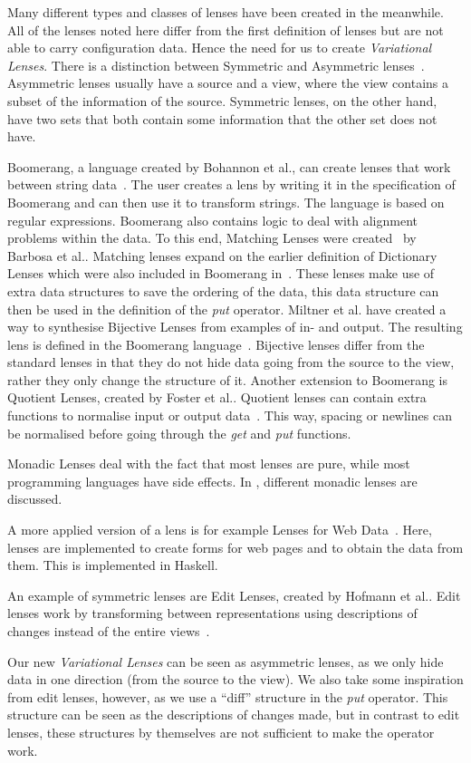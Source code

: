 Many different types and classes of lenses have been created in the meanwhile.
All of the lenses noted here differ from the first definition of lenses but
are not able to carry configuration data. Hence the need for us to create \emph{Variational Lenses}.
There is a distinction between Symmetric and Asymmetric lenses~\cite{hofmann2011symmetric}.
Asymmetric lenses usually have a source and a view, where the view contains a
subset of the information of the source. Symmetric lenses, on the other hand,
have two sets that both contain some information that the other set does not
have. 

Boomerang, a language created by Bohannon et al., can create lenses that work
between string data~\cite{bohannon2008boomerang}. The user creates a lens by
writing it in the specification of Boomerang and can then use it to transform
strings. The language is based on regular expressions. Boomerang also contains
logic to deal with alignment problems within the data. To this end, Matching
Lenses were created~\cite{barbosa2010matching} by Barbosa et al.. Matching
lenses expand on the earlier definition of Dictionary Lenses which were also
included in Boomerang in~\cite{bohannon2008boomerang}. These lenses make use of
extra data structures to save the ordering of the data, this data structure can
then be used in the definition of the \emph{put} operator. Miltner et al. have
created a way to synthesise Bijective Lenses from examples of in- and output.
The resulting lens is defined in the Boomerang language~\cite{miltner2017synthesizing}.
Bijective lenses differ from the standard lenses in that they do not hide data
going from the source to the view, rather they only change the structure of it.
Another extension to Boomerang is Quotient Lenses, created by Foster et al..
Quotient lenses can contain extra functions to normalise input or output data~\cite{foster2008quotient}.
This way, spacing or newlines can be normalised before going through the
\emph{get} and \emph{put} functions.

Monadic Lenses deal with the fact that most lenses are pure, while most
programming languages have side effects. In \cite{abou2016reflections},
different monadic lenses are discussed.

A more applied version of a lens is for example Lenses for Web Data~\cite{rajkumar2014lenses}.
Here, lenses are implemented to create forms for web pages and to obtain the
data from them. This is implemented in Haskell.

An example of symmetric lenses are Edit Lenses, created by Hofmann et al.. Edit
lenses work by transforming between representations using descriptions of
changes instead of the entire views~\cite{hofmann2012edit}. 

Our new \emph{Variational Lenses} can be seen as asymmetric lenses, as we only
hide data in one direction (from the source to the view). We also take some 
inspiration from edit lenses, however, as we use a ``diff'' structure in the \emph{put}
operator. This structure can be seen as the descriptions of changes made, but
in contrast to edit lenses, these structures by themselves are not sufficient
to make the operator work.
